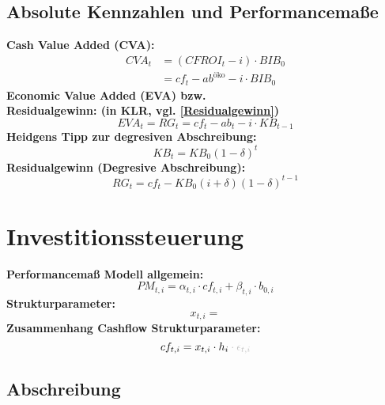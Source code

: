 \documentclass[leqno]{scrartcl}
\begin{document}
\begin{multicols}{4}
\subsection{Absolute Kennzahlen und Performancemaße}

\textbf{Cash Value Added (CVA):}
  \begin{equation*}
  \begin{split}
    CVA_t &= (CFROI_t - i) \cdot BIB_0\\
          &= cf_t-ab^{\text{öko}}- i\cdot BIB_0
  \end{split}
  \end{equation*}
\textbf{Economic Value Added (EVA) bzw.}\\
\textbf{Residualgewinn: (in KLR, vgl. \ref{Residualgewinn})}
  \begin{equation*}
    EVA_t = RG_t = cf_t - ab_t - i\cdot KB_{t-1}
  \end{equation*}
\textbf{Heidgens Tipp zur degresiven Abschreibung:}
  \begin{equation*}
    KB_t = KB_0(1-\delta)^t
  \end{equation*}
\textbf{Residualgewinn (Degresive Abschreibung):}
  \begin{equation*} 
    RG_t = cf_t - KB_0(i+\delta)(1-\delta)^{t-1}
  \end{equation*}


\section{Investitionssteuerung}

\textbf{Performancemaß Modell allgemein:}
  \begin{equation*}
    PM_{t,i} = \alpha_{t,i} \cdot cf_{t,i} + \beta_{t,i} \cdot b_{0,i}
  \end{equation*}
\textbf{Strukturparameter:}
  \begin{equation*}
    x_{t,i} =
  \end{equation*}
\textbf{Zusammenhang Cashflow Strukturparameter:}
  \begin{equation*}
    cf_{t,i} = x_{t,i} \cdot h_i \color{lightgray}\cdot \epsilon_{t,i}
  \end{equation*}

\subsection{Abschreibung}


\end{multicols}
\end{document}
